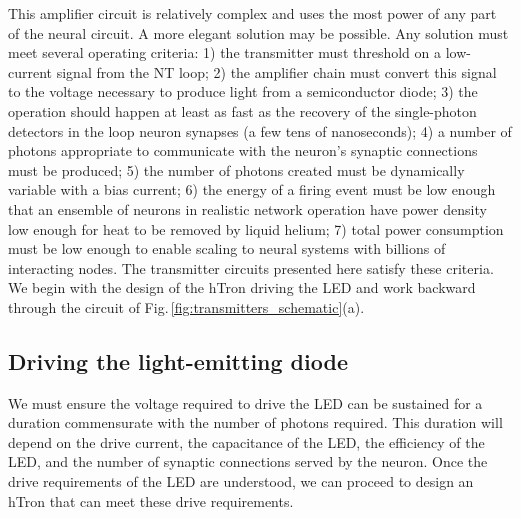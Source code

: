 \documentclass[aip,amsmath,amssymb,reprint,nofootinbib]{revtex4-1}
\begin{document}
This amplifier circuit is relatively complex and uses the most power of any part of the neural circuit. A more elegant solution may be possible. Any solution must meet several operating criteria: 1) the transmitter must threshold on a low-current signal from the NT loop; 2) the amplifier chain must convert this signal to the voltage necessary to produce light from a semiconductor diode; 3) the operation should happen at least as fast as the recovery of the single-photon detectors in the loop neuron synapses (a few tens of nanoseconds); 4) a number of photons appropriate to communicate with the neuron's synaptic connections must be produced; 5) the number of photons created must be dynamically variable with a bias current; 6) the energy of a firing event must be low enough that an ensemble of neurons in realistic network operation have power density low enough for heat to be removed by liquid helium; 7) total power consumption must be low enough to enable scaling to neural systems with billions of interacting nodes. The transmitter circuits presented here satisfy these criteria. We begin with the design of the hTron driving the LED and work backward through the circuit of Fig.\,\ref{fig:transmitters_schematic}(a).
	
\subsection{\label{sec:LED}Driving the light-emitting diode}
We must ensure the voltage required to drive the LED can be sustained for a duration commensurate with the number of photons required. This duration will depend on the drive current, the capacitance of the LED, the efficiency of the LED, and the number of synaptic connections served by the neuron. Once the drive requirements of the LED are understood, we can proceed to design an hTron that can meet these drive requirements.
\end{document}
